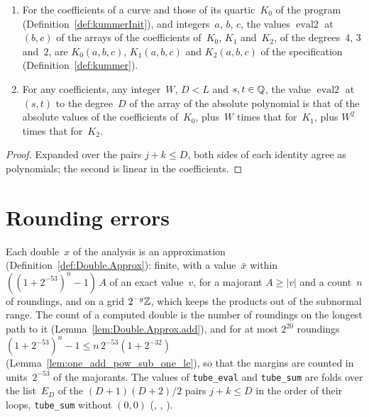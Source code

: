 \begin{lemma}\label{lem:eval2_k0Coeff}
  \leanok
  \begin{enumerate}
    \item For the coefficients of a curve and those of its quartic~$K_0$ of the program
      (Definition~\ref{def:kummerInit}), and integers~$a$, $b$, $c$, the values
      $\operatorname{eval2}$ at $(b, c)$ of the arrays of the coefficients of~$K_0$, $K_1$ and~$K_2$,
      of the degrees~$4$, $3$ and~$2$, are $K_0(a, b, c)$, $K_1(a, b, c)$ and $K_2(a, b, c)$ of the
      specification (Definition~\ref{def:kummer}).
    \item For any coefficients, any integer~$W$, $D < L$ and $s, t \in \mathbb{Q}$, the value
      $\operatorname{eval2}$ at $(s, t)$ to the degree~$D$ of the array of the absolute polynomial
      is that of the absolute values of the coefficients of~$K_0$, plus~$W$ times that for~$K_1$,
      plus $W^2$ times that for~$K_2$.
  \end{enumerate}
\end{lemma}

\begin{proof}
  \leanok
  Expanded over the pairs $j + k \le D$, both sides of each identity agree as polynomials; the
  second is linear in the coefficients.
\end{proof}

\section{Rounding errors}\label{sec:tubeErrors}

Each double~$x$ of the analysis is an approximation (Definition~\ref{def:Double.Approx}): finite,
with a value~$\bar x$ within $((1 + 2^{-53})^n - 1)\, A$ of an exact value~$v$, for a majorant
$A \ge |v|$ and a count~$n$ of roundings, and on a grid $2^{-g}\mathbb{Z}$, which keeps the products out
of the subnormal range. The count of a computed double is the number of roundings on the longest
path to it (Lemma~\ref{lem:Double.Approx.add}), and for at most $2^{20}$ roundings
$(1 + 2^{-53})^n - 1 \le n\, 2^{-53} (1 + 2^{-32})$ (Lemma~\ref{lem:one_add_pow_sub_one_le}), so
that the margins are counted in units~$2^{-53}$ of the majorants. The values of \texttt{tube\_eval}
and \texttt{tube\_sum} are folds over the list~$E_D$ of the $(D + 1)(D + 2)/2$ pairs
$j + k \le D$ in the order of their loops, \texttt{tube\_sum} without $(0, 0)$
(, , ).

